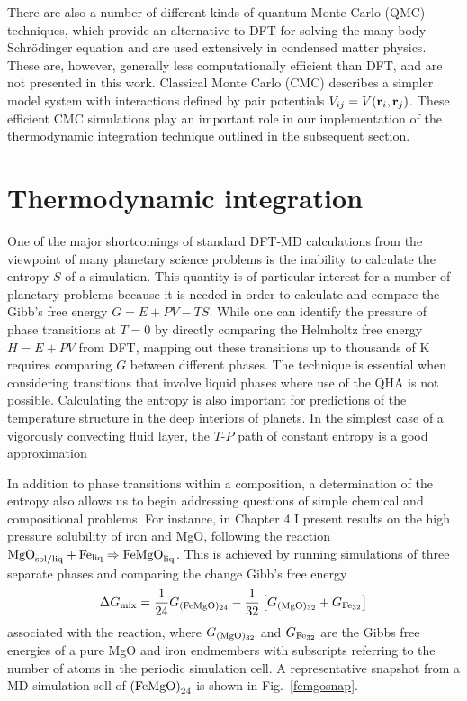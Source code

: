 There are also a number of different kinds of quantum Monte Carlo (QMC) techniques,
which provide an alternative to DFT for solving the many-body Schr\"{o}dinger
equation and are used extensively in condensed matter physics. These are, however,
generally less computationally efficient than DFT, and are not presented in this
work. Classical Monte Carlo (CMC) describes a simpler model system with interactions
defined by pair potentials $V_{ij}=V({\bf r}_i,{\bf r}_j)$. These efficient CMC
simulations play an important role in our implementation of the thermodynamic
integration technique outlined in the subsequent section.

\section{Thermodynamic integration}

One of the major shortcomings of standard DFT-MD calculations from the viewpoint of
many planetary science problems is the inability to calculate the entropy $S$ of a
simulation. This quantity is of particular interest for a number of planetary
problems because it is needed in order to calculate and compare the Gibb's free
energy $G=E+PV-TS$. While one can identify the pressure of phase transitions at $T=0$
by directly comparing the Helmholtz free energy $H=E+PV$ from DFT, mapping out these
transitions up to thousands of K requires comparing $G$ between different phases.
The technique is essential when considering transitions that involve liquid phases
where use of the QHA is not possible. Calculating the entropy is also important for
predictions of the temperature structure in the deep interiors of planets. In the
simplest case of a vigorously convecting fluid layer, the $T$-$P$ path of constant
entropy is a good approximation

In addition to phase transitions within a
composition, a determination of the entropy also allows us to begin addressing
questions of simple chemical and compositional problems. For instance, in Chapter 4 I
present results on the high pressure solubility of iron and MgO, following the
reaction $\rm{MgO}_{\rm sol/liq} + \rm{Fe}_{\rm liq} \Rightarrow \rm{FeMgO}_{\rm
liq}$. This is achieved by running simulations of three separate phases and comparing
the change Gibb's free energy
%
\begin{equation} \label{eqn:gibbs1}
  \Delta G_{\rm{\rm mix}}  =  \frac{1}{24}G_{\rm{(FeMgO)_{24}}} 
- \frac{1}{32} \left[  G_{\rm{(MgO)_{32}}}  + G_{\rm{Fe_{32}}} \right]
\end{equation}
%
associated with the reaction, where $G_{\rm{(MgO)_{32}}}$ and   $G_{\rm{Fe_{32}}}$
are the Gibbs free energies of a pure MgO and iron endmembers with subscripts
referring to the number of atoms in the periodic simulation cell. A representative
snapshot from a MD simulation sell of ${\rm(FeMgO)}_{24}$ is shown in
Fig.~\ref{femgosnap}.

